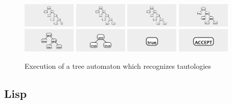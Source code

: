 \documentclass{article}
\begin{document}
\begin{figure}
\begin{center}
\includegraphics[width=1in]{../board/pics/ss1451.png}
\includegraphics[width=1in]{../board/pics/ss1501.png}
\includegraphics[width=1in]{../board/pics/ss1551.png}
\includegraphics[width=1in]{../board/pics/ss1601.png}
\includegraphics[width=1in]{../board/pics/ss1651.png}
\includegraphics[width=1in]{../board/pics/ss1701.png}
\includegraphics[width=1in]{../board/pics/ss1751.png}
\includegraphics[width=1in]{../board/pics/ss1801.png}
\end{center}
\caption{Execution of a tree automaton which recognizes tautologies}
\end{figure}


\subsection{Lisp}
\end{document}
